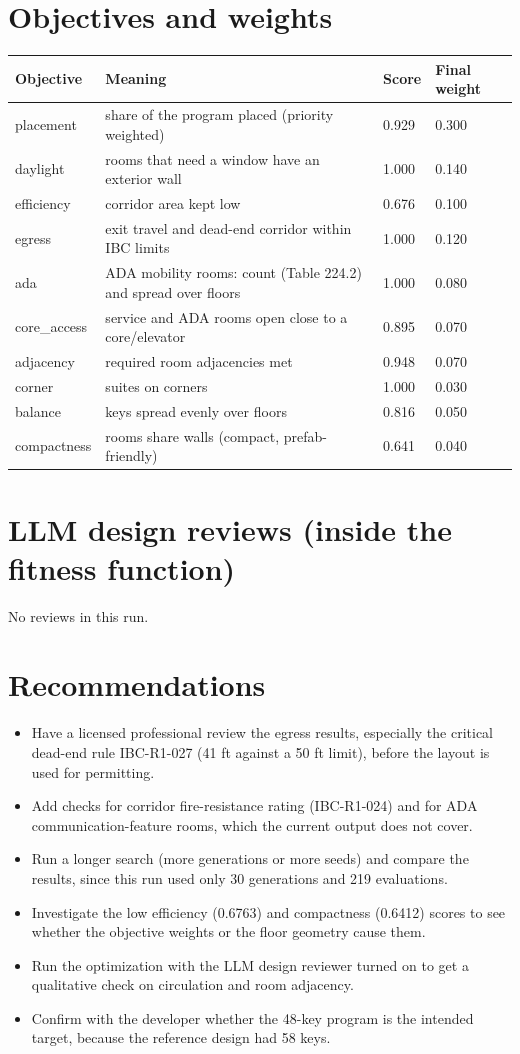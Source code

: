 \documentclass[10pt]{article}
\begin{document}
\section{Objectives and weights}
{\small\begin{longtable}{p{2.4cm}p{8.2cm}p{1.6cm}p{2cm}}\toprule
\textbf{Objective} & \textbf{Meaning} & \textbf{Score} & \textbf{Final weight} \\ \midrule \endhead
placement & share of the program placed (priority weighted) & 0.929 & 0.300 \\
daylight & rooms that need a window have an exterior wall & 1.000 & 0.140 \\
efficiency & corridor area kept low & 0.676 & 0.100 \\
egress & exit travel and dead-end corridor within IBC limits & 1.000 & 0.120 \\
ada & ADA mobility rooms: count (Table 224.2) and spread over floors & 1.000 & 0.080 \\
core\_access & service and ADA rooms open close to a core/elevator & 0.895 & 0.070 \\
adjacency & required room adjacencies met & 0.948 & 0.070 \\
corner & suites on corners & 1.000 & 0.030 \\
balance & keys spread evenly over floors & 0.816 & 0.050 \\
compactness & rooms share walls (compact, prefab-friendly) & 0.641 & 0.040 \\
\bottomrule\end{longtable}}

\section{LLM design reviews (inside the fitness function)}
No reviews in this run.

\section{Recommendations}
\begin{itemize}
\item Have a licensed professional review the egress results, especially the critical dead-end rule IBC-R1-027 (41 ft against a 50 ft limit), before the layout is used for permitting.
\item Add checks for corridor fire-resistance rating (IBC-R1-024) and for ADA communication-feature rooms, which the current output does not cover.
\item Run a longer search (more generations or more seeds) and compare the results, since this run used only 30 generations and 219 evaluations.
\item Investigate the low efficiency (0.6763) and compactness (0.6412) scores to see whether the objective weights or the floor geometry cause them.
\item Run the optimization with the LLM design reviewer turned on to get a qualitative check on circulation and room adjacency.
\item Confirm with the developer whether the 48-key program is the intended target, because the reference design had 58 keys.
\end{itemize}
\end{document}
